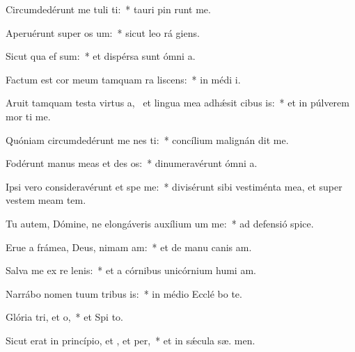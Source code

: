 \item Circumdedérunt me tuli ti:~* tauri pin runt me.
\item Aperuérunt super  os um:~* sicut leo rá  giens.
\item Sicut qua ef sum:~* et dispérsa sunt ómni  a.
\item Factum est cor meum tamquam ra liscens:~* in médi  i.
\item Aruit tamquam testa virtus a,~\pscross{} et lingua mea adhǽsit cibus is:~* et in púlverem mor ti me.
\item Quóniam circumdedérunt me nes ti:~* concílium malignán dit me.
\item Fodérunt manus meas et des os:~* dinumeravérunt ómni  a.
\item Ipsi vero consideravérunt et spe me:~* divisérunt sibi vestiménta mea, et super vestem meam  tem.
\item Tu autem, Dómine, ne elongáveris auxílium um  me:~* ad defensió  spice.
\item Erue a frámea, Deus, nimam am:~* et de manu canis  am.
\item Salva me ex re lenis:~* et a córnibus unicórnium humi am.
\item Narrábo nomen tuum tribus is:~* in médio Ecclé bo te.
\item Glória tri, et o,~* et Spi to.
\item Sicut erat in princípio, et , et per,~* et in sǽcula sæ. men.
